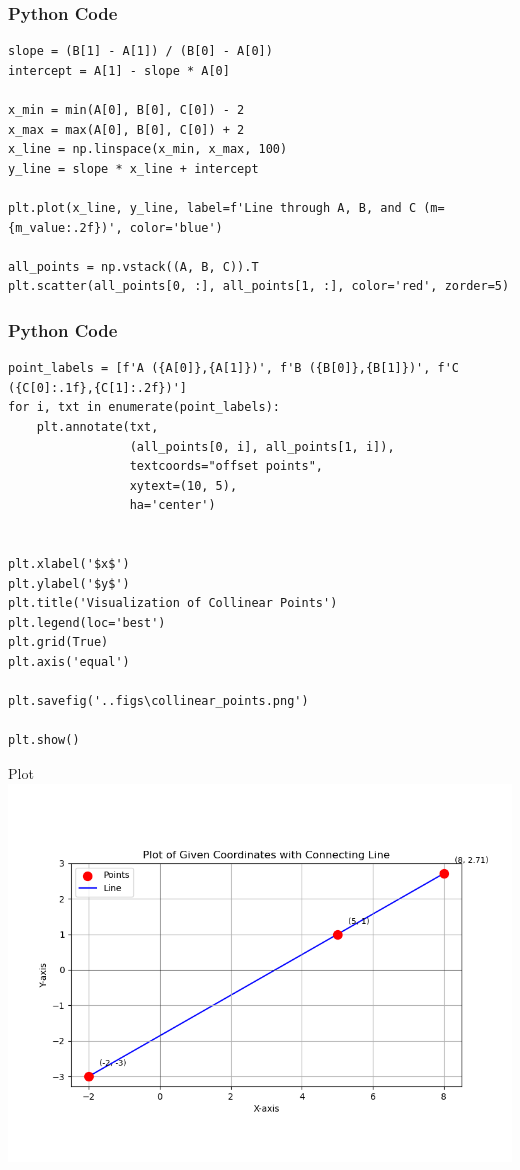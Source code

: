 \documentclass{beamer}
\begin{document}
\begin{frame}[fragile]
    \frametitle{Python Code}
    \begin{lstlisting}
slope = (B[1] - A[1]) / (B[0] - A[0])
intercept = A[1] - slope * A[0]

x_min = min(A[0], B[0], C[0]) - 2
x_max = max(A[0], B[0], C[0]) + 2
x_line = np.linspace(x_min, x_max, 100)
y_line = slope * x_line + intercept

plt.plot(x_line, y_line, label=f'Line through A, B, and C (m={m_value:.2f})', color='blue')

all_points = np.vstack((A, B, C)).T
plt.scatter(all_points[0, :], all_points[1, :], color='red', zorder=5)

    \end{lstlisting}
\end{frame}
\begin{frame}[fragile]
    \frametitle{Python Code}
    \begin{lstlisting}
point_labels = [f'A ({A[0]},{A[1]})', f'B ({B[0]},{B[1]})', f'C ({C[0]:.1f},{C[1]:.2f})']
for i, txt in enumerate(point_labels):
    plt.annotate(txt,
                 (all_points[0, i], all_points[1, i]),
                 textcoords="offset points",
                 xytext=(10, 5),
                 ha='center')


plt.xlabel('$x$')
plt.ylabel('$y$')
plt.title('Visualization of Collinear Points')
plt.legend(loc='best')
plt.grid(True)
plt.axis('equal')

plt.savefig('..figs\collinear_points.png')

plt.show()
    \end{lstlisting}
\end{frame}

\begin{frame}{Plot}
    \centering
    \includegraphics[width=\columnwidth, height=0.8\textheight, keepaspectratio]{figs/fig.png}     
\end{frame}
\end{document}
